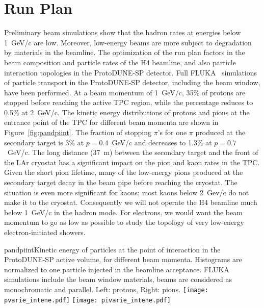 \section{Run Plan}
\label{sec:runplan}

Preliminary beam simulations show that the hadron rates at 
energies below 1~GeV/c are low. Moreover, low-energy beams are more
subject to degradation by materials in the
beamline.  The optimization of the run plan factors in the beam composition and particle rates of the H4 beamline, and 
also particle interaction topologies in the ProtoDUNE-SP detector. Full FLUKA~%
simulations of particle transport in the ProtoDUNE-SP detector, including the
beam window, have been performed.
%
At a beam momentum of 1~GeV/c, 35\% of protons are stopped before reaching the active TPC region, while the percentage reduces to 0.5\% at 2~GeV/c.  The kinetic energy distributions of protons and pions at the entrance point of the TPC for different beam momenta are shown in Figure~\ref{fig:pandpiint}. 
The fraction of stopping $\pi$'s for one $\pi$
produced at the secondary target is 3\% at $p=0.4$~GeV/c and decreases to 1.3\% at $p=0.7$~GeV/c.
%
The long distance (37~m) between the secondary target and the front of the LAr cryostat has a significant impact on the pion and kaon rates in the TPC. Given the short pion lifetime, many of the  low-energy pions produced at the secondary target decay in the beam pipe before reaching the cryostat. The situation is even more significant for kaons; most kaons below 2~Gev/c do not make it to the cryostat.
Consequently we will not operate the H4 beamline much below 1~GeV/c in the hadron mode.
For electrons, we would want the beam momentum to go as low as possible to study the topology of very low-energy electron-initiated 
showers.
\begin{cdrfigure}{pandpiint}{Kinetic energy of
    particles at the point of interaction in the ProtoDUNE-SP active
    volume, for different beam momenta. Histograms are normalized to one particle injected in the
    beamline acceptance. FLUKA simulations include the beam window
    materials, beams are considered as monochromatic and
    parallel. Left: protons, Right: pions.}
  \texttt{[image: pvarie\_intene.pdf]}
  \texttt{[image: pivarie\_intene.pdf]}
\end{cdrfigure}


